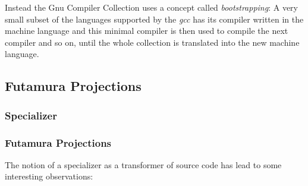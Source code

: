 Instead the Gnu Compiler Collection uses a concept called {\em bootstrapping}:
A very small subset of the languages supported by the {\em gcc} has its 
compiler written in the machine language and this minimal compiler is then 
used to compile the next compiler and so on, until the whole collection is 
translated into the new machine language.

\subsection{Futamura Projections} %
\label{sub:Futamura}
\subsubsection{Specializer} %
\label{ssub:Specializer}
\subsubsection{Futamura Projections} %
\label{ssub:Futamura Projections}
The notion of a specializer as a transformer of source code has lead to some 
interesting observations: 

